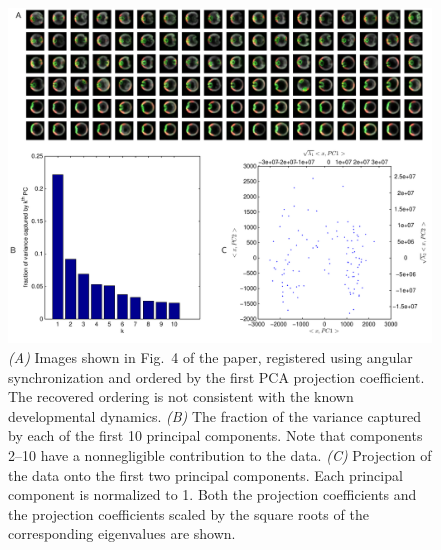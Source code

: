 \documentclass{pnastwo}
\newcommand{\fig}[0]{Fig.}
\begin{document}
\begin{figure}
\includegraphics{figS8}

\caption{{\it (A)} Images shown in \fig~4 of the paper, registered using angular synchronization \cite{singer2011angular} and ordered by the first PCA projection coefficient. The recovered ordering is not consistent with the known developmental dynamics. {\it (B)} The fraction of the variance captured by each of the first 10 principal components. Note that components 2--10 have a nonnegligible contribution to the data. {\it (C)} Projection of the data onto the first two principal components. Each principal component is normalized to 1. Both the projection coefficients and the projection coefficients scaled by the square roots of the corresponding eigenvalues are shown.  }
\label{fig:PCA_results}
\end{figure}
\end{document}
